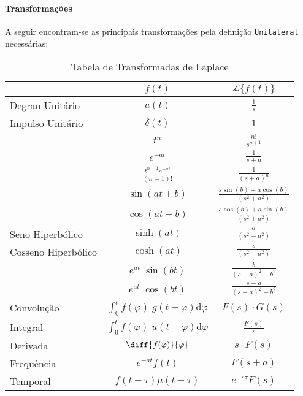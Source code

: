 \documentclass{article}
\begin{document}
            \paragraph{Transformações}A seguir encontram-se as principais transformações pela definição \texttt{Unilateral} necessárias:
                \begin{table}[H]
                    \centering
                    \begingroup
                    \renewcommand{\arraystretch}{1.25}
                    \begin{tabular}[]{lcc}
                                         & $f(t)$      & $\mathcal{L}\{ f(t) \}$\\\hline
                        Degrau Unitário  & $u(t)$      & $\frac{1}{s}$\\
                        Impulso Unitário & $\delta(t)$ & $1$\\
                                         & $t^{n}$     & $\frac{n!}{s^{n+1}}$\\
                                         & $e^{-at}$   & $\frac{1}{s+a}$\\
                                         & $\frac{t^{n-1}e^{-at}}{(n-1)!}$  & $\frac{1}{(s+a)^{n}}$\\
                                         & $\sin(at + b)$  & $\frac{s\sin(b) + a\cos(b)}{(s^2+a^2)}$\\
                                         & $\cos(at + b)$  & $\frac{s\cos(b) + a\sin(b)}{(s^2+a^2)}$\\
                        Seno Hiperbólico    & $\sinh(at)$  & $\frac{a}{(s^2-a^2)}$\\
                        Cosseno Hiperbólico & $\cosh(at)$  & $\frac{s}{(s^2-a^2)}$\\
                                         & $e^{at}\;\sin(bt)$  & $\frac{b}{(s-a)^2+b^2}$\\
                                         & $e^{at}\;\cos(bt)$  & $\frac{s-a}{(s-a)^2+b^2}$\\
                        Convolução       & $\int_{0}^{t} f(\varphi)\;g(t - \varphi) \text{d}\varphi$ & $F(s)\cdot G(s)$\\
                        Integral         & $\int_{0}^{t} f(\varphi)\;u(t - \varphi) \text{d}\varphi$ & $\frac{F(s)}{s}$\\
                        Derivada         & $\diff{f(\varphi)}{\varphi}$ & $s\cdot F(s)$\\
                        Frequência       & $e^{-at}f(t)$          & $F(s+a)$\\
                        Temporal         & $f(t-\tau)\mu(t-\tau)$ & $e^{-s\tau}F(s)$\\\hline
                    \end{tabular}
                    \endgroup
                    \caption{Tabela de Transformadas de Laplace}\label{table:Laplace}
                \end{table} \noindent
\end{document}
